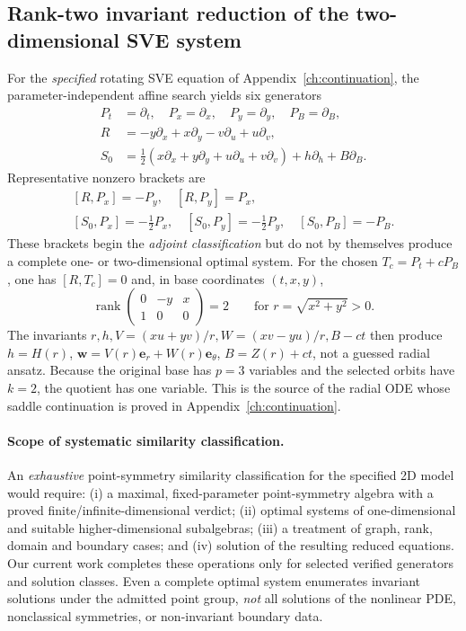 \documentclass[12pt,a4paper,oneside]{report}
\numberwithin{equation}{chapter}
\theoremstyle{remark}\newtheorem{remark}[theorem]{Remark}
\begin{document}
\subsection{Rank-two invariant reduction of the two-dimensional SVE system}
For the \emph{specified} rotating SVE equation of Appendix~\ref{ch:continuation}, the
parameter-independent affine search yields six generators
\begin{equation}\label{eq:affine2d-basis}
\begin{aligned}
 P_t&=\partial_t,\quad P_x=\partial_x,\quad
 P_y=\partial_y,\quad P_B=\partial_B,\\
 R&=-y\partial_x+x\partial_y-v\partial_u+u\partial_v,\\
 S_0&=\tfrac12(x\partial_x+y\partial_y+u\partial_u+v\partial_v)
       +h\partial_h+B\partial_B.
\end{aligned}
\end{equation}
Representative nonzero brackets are
\begin{equation}\label{eq:affine2d-brackets}
 \begin{gathered}
 [R,P_x]=-P_y,\quad [R,P_y]=P_x,\\
 [S_0,P_x]=-\tfrac12P_x,\quad
 [S_0,P_y]=-\tfrac12P_y,\quad [S_0,P_B]=-P_B.
 \end{gathered}
\end{equation}
These brackets begin the \emph{adjoint classification} but do not by
themselves produce a complete one- or two-dimensional optimal system.
For the chosen $T_c=P_t+cP_B$, one has $[R,T_c]=0$ and, in base
coordinates $(t,x,y)$,
\begin{equation}\label{eq:annular-rank-matrix}
 \operatorname{rank}\!\begin{pmatrix}
  0&-y&x\\1&0&0
 \end{pmatrix}=2\qquad\text{for }r=\sqrt{x^2+y^2}>0.
\end{equation}
The invariants $r,h,V=(xu+yv)/r,W=(xv-yu)/r,B-ct$ then
produce $h=H(r)$, $\mathbf w=V(r)\mathbf e_r+W(r)\mathbf e_\theta$,
$B=Z(r)+ct$, not a guessed radial ansatz. Because the original base
has $p=3$ variables and the selected orbits have $k=2$,
the quotient has one variable. This is the source of the radial ODE
whose saddle continuation is proved in Appendix~\ref{ch:continuation}.

\paragraph{Scope of systematic similarity classification.}
An \emph{exhaustive} point-symmetry similarity classification for the
specified 2D model would require: (i) a maximal, fixed-parameter
point-symmetry algebra with a proved finite/infinite-dimensional verdict;
(ii) optimal systems of one-dimensional and suitable higher-dimensional
subalgebras; (iii) a treatment of graph, rank, domain and boundary cases;
and (iv) solution of the resulting reduced equations. Our current work
completes these operations only for selected verified generators and
solution classes. Even a complete optimal system enumerates invariant
solutions under the admitted point group, \emph{not} all solutions of the
nonlinear PDE, nonclassical symmetries, or non-invariant boundary data.
\end{document}
